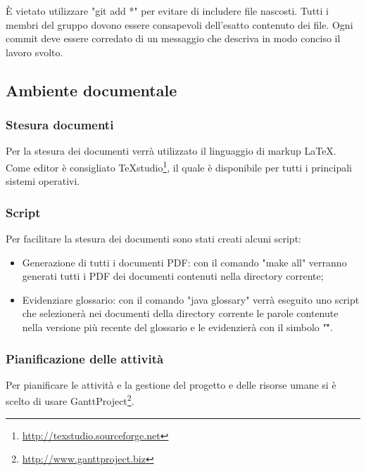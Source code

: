 \noindent È vietato utilizzare "git add *" per evitare di includere file nascosti. Tutti i membri del gruppo dovono essere consapevoli dell'esatto contenuto dei file. Ogni commit deve essere corredato di un messaggio che descriva in modo \gls{conciso} il lavoro svolto.

\newpage
\subsection{Ambiente documentale}

\subsubsection{Stesura documenti}

Per la stesura dei documenti verrà utilizzato il \gls{linguaggio di markup} \LaTeX.
Come editor è consigliato TeXstudio\footnote{\url{http://texstudio.sourceforge.net}}, il quale è disponibile per tutti i principali sistemi operativi.

\subsubsection{Script}

Per facilitare la stesura dei documenti sono stati creati alcuni script:

\begin{itemize}
	\item Generazione di tutti i documenti PDF: con il comando "make all" verranno generati tutti i PDF dei documenti contenuti nella directory corrente;
	\item Evidenziare glossario: con il comando "java glossary" verrà eseguito uno script che selezionerà nei documenti della directory corrente le parole contenute nella versione più recente del glossario e le evidenzierà con il simbolo "\G".

\end{itemize}

\subsubsection{Pianificazione delle attività}
Per pianificare le attività e la gestione del progetto e delle risorse umane si è scelto di usare \gls{GanttProject}\footnote{\url{http://www.ganttproject.biz}}.

